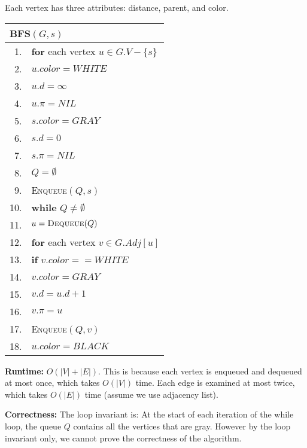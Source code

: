 \documentclass[a4paper,12pt]{article}
\begin{document}
Each vertex has three attributes: distance, parent, and color.

\begin{center}
	\begin{tabular}{rl}
		\toprule
		\multicolumn{2}{l}{\textsc{BFS}$(G, s)$} \\
		\midrule
		1. & \textbf{for} each vertex $u \in G.V - \{s\}$ \\
		2. & \quad $u.color = WHITE$ \\
		3. & \quad $u.d = \infty$ \\
		4. & \quad $u.\pi = NIL$ \\
		5. & $s.color = GRAY$ \\
		6. & $s.d = 0$ \\
		7. & $s.\pi = NIL$ \\
		8. & $Q = \emptyset$ \\
		9. & \textsc{Enqueue}$(Q, s)$ \\
		10. & \textbf{while} $Q \neq \emptyset$ \\
		11. & \quad $u = \textsc{Dequeue}(Q)$ \\
		12. & \quad \textbf{for} each vertex $v \in G.Adj[u]$ \\
		13. & \quad \quad \textbf{if} $v.color == WHITE$ \\
		14. & \quad \quad \quad $v.color = GRAY$ \\
		15. & \quad \quad \quad $v.d = u.d + 1$ \\
		16. & \quad \quad \quad $v.\pi = u$ \\
		17. & \quad \quad \quad \textsc{Enqueue}$(Q, v)$ \\
		18. & \quad $u.color = BLACK$ \\
		\bottomrule
	\end{tabular}
\end{center}

\textbf{Runtime:}
$O(|V| + |E|)$.
This is because each vertex is enqueued and dequeued at most once, which takes $O(|V|)$ time.
Each edge is examined at most twice, which takes $O(|E|)$ time (assume we use adjacency list).

\textbf{Correctness:}
The loop invariant is: 
At the start of each iteration of the while loop, the queue $Q$ contains all the vertices that are gray.
However by the loop invariant only, we cannot prove the correctness of the algorithm.
\end{document}
